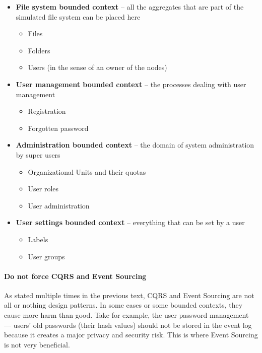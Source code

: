 \documentclass{book}
\begin{document}
\begin{itemize}
\tightlist
\item
  \textbf{File system bounded context} -- all the aggregates that are
  part of the simulated file system can be placed here

  \begin{itemize}
  \tightlist
  \item
    Files
  \item
    Folders
  \item
    Users (in the sense of an owner of the nodes)
  \end{itemize}
\item
  \textbf{User management bounded context} -- the processes dealing with
  user management

  \begin{itemize}
  \tightlist
  \item
    Registration
  \item
    Forgotten password
  \end{itemize}
\item
  \textbf{Administration bounded context} -- the domain of system
  administration by super users

  \begin{itemize}
  \tightlist
  \item
    Organizational Units and their quotas
  \item
    User roles
  \item
    User administration
  \end{itemize}
\item
  \textbf{User settings bounded context} -- everything that can be set
  by a user

  \begin{itemize}
  \tightlist
  \item
    Labels
  \item
    User groups
  \end{itemize}
\end{itemize}

\paragraph{Do not force CQRS and Event
Sourcing}\label{do-not-force-cqrs-and-event-sourcing}

As stated multiple times in the previous text, CQRS and Event Sourcing
are not all or nothing design patterns. In some cases or some bounded
contexts, they cause more harm than good. Take for example, the user
password management --- users' old passwords (their hash values) should
not be stored in the event log because it creates a major privacy and
security risk. This is where Event Sourcing is not very beneficial.
\end{document}
